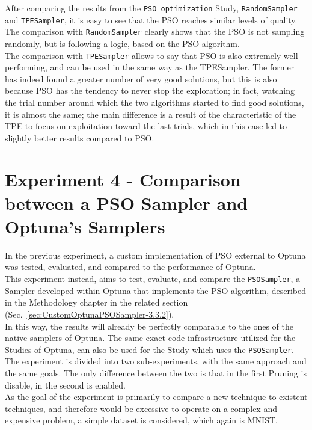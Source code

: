 After comparing the results from the \texttt{PSO\_optimization} Study, \texttt{RandomSampler} and \texttt{TPESampler}, it is easy to see that the PSO reaches similar levels of quality.
\\[0.3cm]The comparison with \texttt{RandomSampler} clearly shows that the PSO is not sampling randomly, but is following a logic, based on the PSO algorithm.
\\[0.3cm]The comparison with \texttt{TPESampler} allows to say that PSO is also extremely well-performing, and can be used in the same way as the TPESampler. The former has indeed found a greater number of very good solutions, but this is also because PSO has the tendency to never stop the exploration; in fact, watching the trial number around which the two algorithms started to find good solutions, it is almost the same; the main difference is a result of the characteristic of the TPE to focus on exploitation toward the last trials, which in this case led to slightly better results compared to PSO.

\section{Experiment 4 - Comparison between a PSO Sampler and Optuna's Samplers}

In the previous experiment, a custom implementation of PSO external to Optuna was tested, evaluated, and compared to the performance of Optuna.
\\[0.3cm]This experiment instead, aims to test, evaluate, and compare the \texttt{PSOSampler}, a Sampler developed within Optuna that implements the PSO algorithm, described in the Methodology chapter in the related section (Sec.~\ref{sec:CustomOptunaPSOSampler-3.3.2}).
\\[0.3cm]In this way, the results will already be perfectly comparable to the ones of the native samplers of Optuna. The same exact code infrastructure utilized for the Studies of Optuna, can also be used for the Study which uses the \texttt{PSOSampler}.
\\[0.3cm]The experiment is divided into two sub-experiments, with the same approach and the same goals. The only difference between the two is that in the first Pruning is disable, in the second is enabled.
\\[0.3cm]As the goal of the experiment is primarily to compare a new technique to existent techniques, and therefore would be excessive to operate on a complex and expensive problem, a simple dataset is considered, which again is MNIST.

